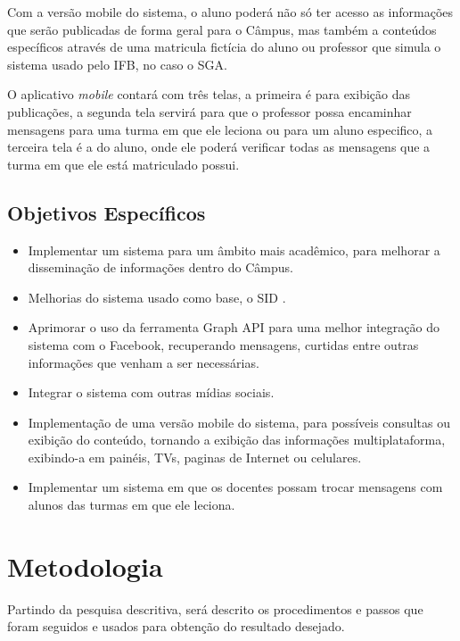 Com a versão mobile do sistema, o aluno poderá não só ter acesso as informações que serão publicadas de forma geral para o Câmpus, mas também a conteúdos específicos através de uma matricula fictícia do aluno ou professor que simula o sistema usado pelo IFB, no caso o SGA. 

O aplicativo \textit{mobile} contará com três telas, a primeira é para exibição das publicações, a segunda tela servirá para que o professor possa encaminhar mensagens para uma turma em que ele leciona ou para um aluno especifico, a terceira tela é a do aluno, onde ele poderá verificar todas as mensagens que a turma em que ele está matriculado possui.

\subsection{Objetivos Específicos}
	 \begin{itemize}
	\item Implementar um sistema para um âmbito mais acadêmico, para melhorar a disseminação de informações dentro do Câmpus.
	 	
	\item Melhorias do sistema usado como base, o SID \cite{sobrinho2017}.
	
	\item Aprimorar o uso da ferramenta Graph API para uma melhor integração do sistema com o Facebook, recuperando mensagens, curtidas entre outras informações que venham a ser necessárias.
	
	\item Integrar o sistema com outras mídias sociais.
	
	\item Implementação de uma versão mobile do sistema, para possíveis consultas ou exibição do conteúdo, tornando a exibição das informações multiplataforma, exibindo-a em painéis, TVs, paginas de Internet ou celulares.
	
	\item  Implementar um sistema em que os docentes possam trocar mensagens com alunos das turmas em que ele leciona.
	\end{itemize}
\section{Metodologia}
Partindo da pesquisa descritiva, será descrito os procedimentos e passos que foram seguidos e usados para obtenção do resultado desejado.
	
